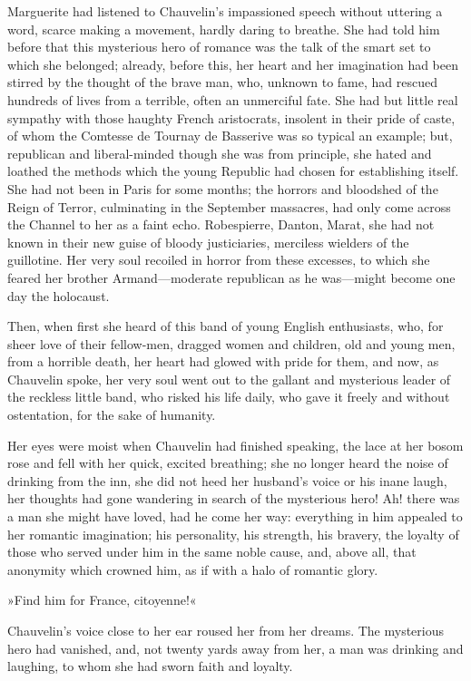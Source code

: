 Marguerite had listened to Chauvelin's impassioned  speech without uttering a word, scarce making a movement, hard\-ly daring to breathe. She had told him before that this mysterious hero of romance was the talk of the smart set to which she belonged; already, before this, her heart and her imagination had been stirred by the thought of the brave man, who, unknown to fame, had rescued hundreds of lives from a terrible, often an unmerciful fate. She had but little real sympathy with those haughty French aristocrats, insolent in their pride of caste, of whom the Comtesse de Tournay de Basserive was so typical an example; but, republican and liberal-minded though she was from principle, she hated and loathed the methods which the young Republic had chosen for establishing itself. She had not been in Paris for some months; the horrors and bloodshed of the Reign of Terror, culminating in the September massacres, had only come across the Channel to her as a faint echo. Robespierre, Danton, Marat, she had not known in their new guise of bloody justiciaries, merciless wielders of the guillotine. Her very soul recoiled in horror from these excesses, to which she feared her brother Armand—moderate republican as he was—might become one day the holocaust.

Then, when first she heard of this band of young English enthusiasts, who, for sheer love of their fellow-men, dragged women and children, old and young men, from a horrible death, her heart had glowed with pride for them, and now, as Chauvelin spoke, her very soul went out to the gallant and mysterious leader of the reckless little band, who risked his life daily, who gave it freely and without ostentation, for the sake of humanity.

Her eyes were moist when Chauvelin had finished speaking, the lace at her bosom rose and fell with her quick, excited breathing; she no longer heard the noise of drinking from the inn, she did not heed her husband's voice or his inane laugh, her thoughts had gone wandering in search of the mysterious hero! Ah! there was a man she might have loved, had he come her way: everything in him appealed to her romantic imagination; his personality, his strength, his bravery, the loyalty of those who served under him in the same noble cause, and, above all, that anonymity which crowned him, as if with a halo of romantic glory.

»Find him for France, citoyenne!«

Chauvelin's voice close to her ear roused her from her dreams. The mysterious hero had vanished, and, not twenty yards away from her, a man was drinking and laughing, to whom she had sworn faith and loyalty.

